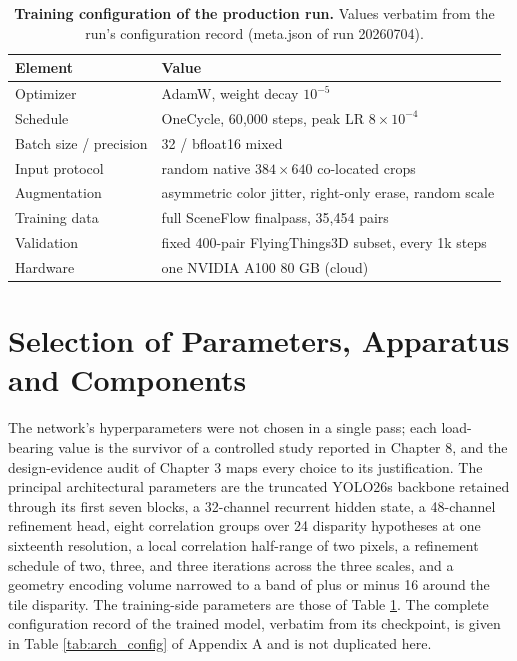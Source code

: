 \begin{table}[!htbp]
\centering
\caption{\textbf{Training configuration of the production run.} Values verbatim from the run's configuration record (meta.json of run 20260704).}
\label{tab:train_config}
\small
\begin{tabular}{ll}
\toprule
Element & Value\\
\midrule
Optimizer & AdamW, weight decay $10^{-5}$\\
Schedule & OneCycle, 60{,}000 steps, peak LR $8\times 10^{-4}$\\
Batch size / precision & 32 / bfloat16 mixed\\
Input protocol & random native $384\times 640$ co-located crops\\
Augmentation & asymmetric color jitter, right-only erase, random scale\\
Training data & full SceneFlow finalpass, 35{,}454 pairs\\
Validation & fixed 400-pair FlyingThings3D subset, every 1k steps\\
Hardware & one NVIDIA A100 80 GB (cloud)\\
\bottomrule
\end{tabular}
\end{table}

\FloatBarrier
\section{Selection of Parameters, Apparatus and Components}
The network's hyperparameters were not chosen in a single pass; each
load-bearing value is the survivor of a controlled study reported in
Chapter 8, and the design-evidence audit of Chapter 3 maps every choice
to its justification. The principal architectural parameters are the
truncated YOLO26s backbone retained through its first seven blocks, a
32-channel recurrent hidden state, a 48-channel refinement head, eight
correlation groups over 24 disparity hypotheses at one sixteenth
resolution, a local correlation half-range of two pixels, a refinement
schedule of two, three, and three iterations across the three scales, and
a geometry encoding volume narrowed to a band of plus or minus 16 around
the tile disparity. The training-side parameters are those of Table
\ref{tab:train_config}. The complete configuration record of the trained
model, verbatim from its checkpoint, is given in Table
\ref{tab:arch_config} of Appendix A and is not duplicated here.

